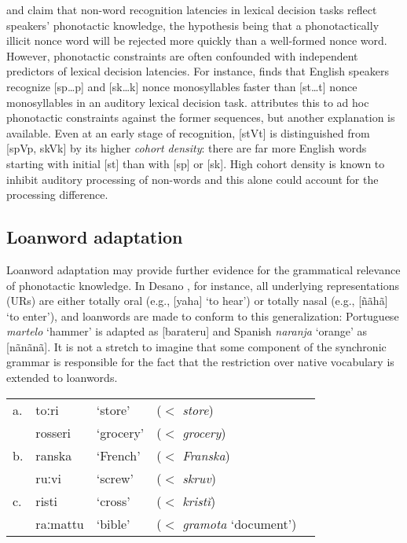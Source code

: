 \citet{Berent2001b} and \citet{Coetzee2008b} claim that non-word recognition latencies in lexical decision tasks reflect speakers' phonotactic knowledge, the hypothesis being that a phonotactically illicit nonce word will be rejected more quickly than a well-formed nonce word.
However, phonotactic constraints are often confounded with independent predictors of lexical decision latencies.
For instance, \citet{Coetzee2008b} finds that English speakers recognize [sp\ldots{}p] and [sk\ldots{}k] nonce monosyllables faster than [st\ldots{}t] nonce monosyllables in an auditory lexical decision task.
\citeauthor{Coetzee2008b} attributes this to ad hoc phonotactic constraints against the former sequences, but another explanation is available.
Even at an early stage of recognition, [stVt] is distinguished from [spVp, skVk] by its higher \emph{cohort density}: there are far more English words starting with initial [st] than with [sp] or [sk].
High cohort density is known to inhibit auditory processing of non-words \citep[e.g.,][]{Marslen-Wilson1978} and this alone could account for the processing difference.

\subsection{Loanword adaptation}

Loanword adaptation may provide further evidence for the grammatical relevance of phonotactic knowledge.
In Desano \citep{Kaye1974}, for instance, all underlying representations (URs) are either totally oral (e.g., [yaha] `to hear') or totally nasal (e.g., [ñãhã] `to enter'), and loanwords are made to conform to this generalization: Portuguese \emph{martelo} `hammer' is adapted as [barateru] and Spanish \emph{naranja} `orange' as [nãnãnã].
It is not a stretch to imagine that some component of the synchronic grammar is responsible for the fact that the restriction over native vocabulary is extended to loanwords.

\begin{example}
\begin{tabular}{l llll}
a. & toːri    & `store'   & ($<$ \emph{store})              & \citep[English:][89]{Hellstrom1976}   \\
   & rosseri  & `grocery' & ($<$ \emph{grocery})            &                             \\
b. & ranska   & `French'  & ($<$ \emph{Franska})            & \citep[Swedish:][67]{Campbell2004}    \\
   & ruːvi    & `screw'   & ($<$ \emph{skruv})              &                             \\
c. & risti    & `cross'   & ($<$ \emph{kristĭ})             & \citep[Old Russian:][60]{Bjornflaten2006} \\
   & raːmattu & `bible'   & ($<$ \emph{gramota} `document') &                             \\
\end{tabular}
\end{example}

